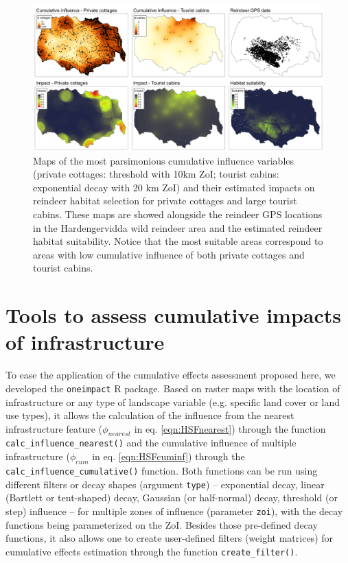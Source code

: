 \documentclass[titlepage]{article}
\begin{document}
\begin{figure}[h]
\centering
\includegraphics[width=1.3\textwidth,center]{figures/reindeer_results_prediction_maps.png}
\caption{\label{fig:prediction_maps} Maps of the most parsimonious cumulative influence variables (private cottages: threshold with 10km ZoI; tourist cabins: exponential decay with 20 km ZoI) and their estimated impacts on reindeer habitat selection for private cottages and large tourist cabins. These maps are showed alongside the reindeer GPS locations in the Hardengervidda wild reindeer area and the estimated reindeer habitat suitability. Notice that the most suitable areas correspond to areas with low cumulative influence of both private cottages and tourist cabins.}
\end{figure}

\section{Tools to assess cumulative impacts of infrastructure}

To ease the application of the cumulative effects assessment proposed here, we developed the \verb|oneimpact| R package. Based on raster maps with the location of infrastructure or any type of landscape variable (e.g. specific land cover or land use types), it allows the calculation of the influence from the nearest infrastructure feature ($\phi_{nearest}$ in eq. \ref{eqn:HSFnearest}) through the function \verb|calc_influence_nearest()| and the cumulative influence of multiple infrastructure ($\phi_{cum}$ in eq. \ref{eqn:HSFcuminf}) through the \verb|calc_influence_cumulative()| function. Both functions can be run using different filters or decay shapes (argument \verb|type|) -- exponential decay, linear (Bartlett or tent-shaped) decay, Gaussian (or half-normal) decay, threshold (or step) influence -- for multiple zones of influence (parameter \verb|zoi|), with the decay functions being parameterized on the ZoI. Besides those pre-defined decay functions, it also allows one to create user-defined filters (weight matrices) for cumulative effects estimation through the function \verb|create_filter()|.
\end{document}
